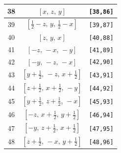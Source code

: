 \documentclass[fleqn,8pt]{jsarticle}
\begin{document}
\begin{longtable}{ccc}
38 & $\left[ x,\, z,\, y \right]$ & {\tt [38,86]} \\ \hline
39 & $\left[ \frac{1}{2} - z,\, y,\, \frac{1}{2} - x \right]$ & {\tt [39,87]} \\ \hline
40 & $\left[ z,\, y,\, x \right]$ & {\tt [40,88]} \\ \hline
41 & $\left[ - z,\, - x,\, - y \right]$ & {\tt [41,89]} \\ \hline
42 & $\left[ - y,\, - z,\, - x \right]$ & {\tt [42,90]} \\ \hline
43 & $\left[ y + \frac{1}{2},\, - z,\, x + \frac{1}{2} \right]$ & {\tt [43,91]} \\ \hline
44 & $\left[ z + \frac{1}{2},\, x + \frac{1}{2},\, - y \right]$ & {\tt [44,92]} \\ \hline
45 & $\left[ y + \frac{1}{2},\, z + \frac{1}{2},\, - x \right]$ & {\tt [45,93]} \\ \hline
46 & $\left[ - z,\, x + \frac{1}{2},\, y + \frac{1}{2} \right]$ & {\tt [46,94]} \\ \hline
47 & $\left[ - y,\, z + \frac{1}{2},\, x + \frac{1}{2} \right]$ & {\tt [47,95]} \\ \hline
48 & $\left[ z + \frac{1}{2},\, - x,\, y + \frac{1}{2} \right]$ & {\tt [48,96]} \\
\end{longtable}
\end{document}
